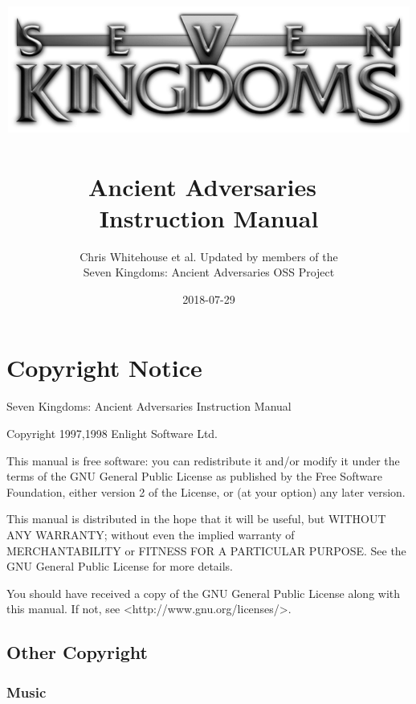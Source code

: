 \documentclass[openany]{book}
\begin{document}
\title{
\includegraphics[width=0.9\linewidth]{7klogo}~\\[1cm]
{\Huge{\textbf{Ancient Adversaries}}}~\\[1cm]
{\huge{\textbf{Instruction Manual}}}
}
\author{Chris Whitehouse et al. Updated by members of the \\
Seven Kingdoms: Ancient Adversaries OSS Project} %
\date{2018-07-29} %

\frontmatter
\maketitle

\section{Copyright Notice}

Seven Kingdoms: Ancient Adversaries Instruction Manual

Copyright 1997,1998 Enlight Software Ltd.

This manual is free software: you can redistribute it and/or modify it under the terms of the GNU General Public License as published by the Free Software Foundation, either version 2 of the License, or (at your option) any later version.

This manual is distributed in the hope that it will be useful, but WITHOUT ANY WARRANTY; without even the implied warranty of MERCHANTABILITY or FITNESS FOR A PARTICULAR PURPOSE.  See the GNU General Public License for more details.

You should have received a copy of the GNU General Public License along with this manual.  If not, see <http://www.gnu.org/licenses/>.

\subsection{Other Copyright}

\subsubsection{Music}
\end{document}
